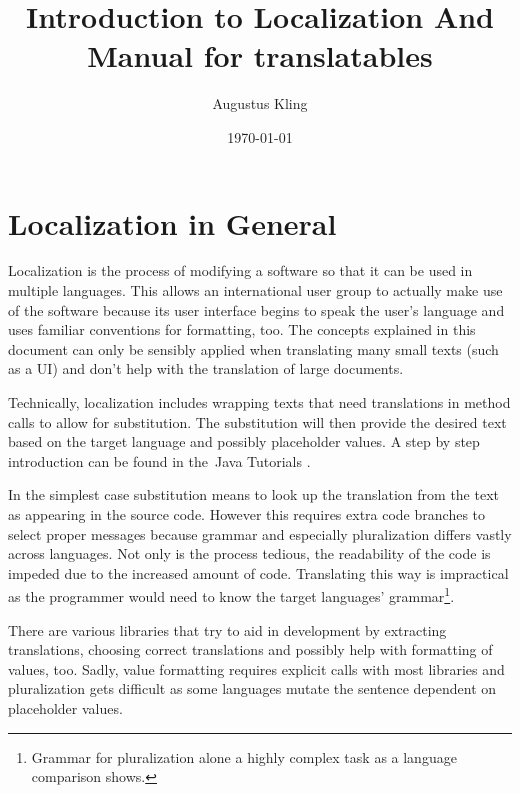 \documentclass[a4paper,11pt,twoside]{report}
\title{Introduction to Localization And Manual for translatables}
\author{Augustus Kling}
\date{\today}
\begin{document}
\maketitle

\tableofcontents

\chapter{Localization in General}
Localization is the process of modifying a software so that it can be used in multiple languages. This allows an international user group to actually make use of the software because its user interface begins to speak the user's language and uses familiar conventions for formatting, too. The concepts explained in this document can only be sensibly applied when translating many small texts (such as a \ac{UI}) and don't help with the translation of large documents.

Technically, localization includes wrapping texts that need translations in method calls to allow for substitution. The substitution will then provide the desired text based on the target language and possibly placeholder values. A step by step introduction can be found in the Java Tutorials \cite{java-i18n-intro}.

In the simplest case substitution means to look up the translation from the text as appearing in the source code. However this requires extra code branches to select proper messages because grammar and especially pluralization differs vastly across languages. Not only is the process tedious, the readability of the code is impeded due to the increased amount of code. Translating this way is impractical as the programmer would need to know the target languages' grammar\footnote{Grammar for pluralization alone a highly complex task \cite{unicode-plural-remarks} as a language comparison \cite{unicode-plural-rules} shows.}.

There are various libraries that try to aid in development by extracting translations, choosing correct translations and possibly help with formatting of values, too. Sadly, value formatting requires explicit calls with most libraries and pluralization gets difficult as some languages mutate the sentence dependent on placeholder values.
\end{document}
